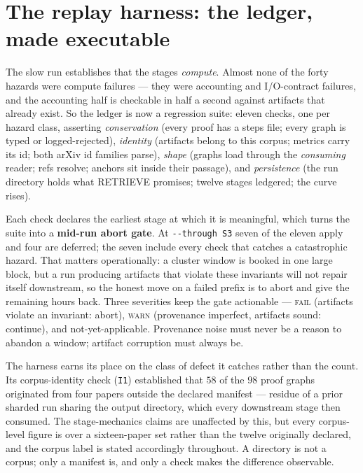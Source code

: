 \documentclass[11pt]{article}
\begin{document}
\section{The replay harness: the ledger, made executable}
\label{sec:replay}

The slow run establishes that the stages \emph{compute}. Almost none of the
forty hazards were compute failures --- they were accounting and I/O-contract
failures, and the accounting half is checkable in half a second against
artifacts that already exist.
So the ledger is now a regression suite: eleven checks, one per hazard class,
asserting \emph{conservation} (every proof has a steps file; every graph is
typed or logged-rejected), \emph{identity} (artifacts belong to this corpus;
metrics carry its id; both arXiv id families parse), \emph{shape} (graphs load
through the \emph{consuming} reader; refs resolve; anchors sit inside their
passage), and \emph{persistence} (the run directory holds what RETRIEVE
promises; twelve stages ledgered; the curve rises).

Each check declares the earliest stage at which it is meaningful, which turns
the suite into a \textbf{mid-run abort gate}. At \texttt{-{}-through S3} seven of
the eleven apply and four are deferred; the seven include every check that
catches a catastrophic hazard. That matters operationally: a cluster window is
booked in one large block, but a run producing artifacts that violate these
invariants will not repair itself downstream, so the honest move on a failed
prefix is to abort and give the remaining hours back. Three severities keep the
gate actionable --- \textsc{fail} (artifacts violate an invariant: abort),
\textsc{warn} (provenance imperfect, artifacts sound: continue), and
not-yet-applicable. Provenance noise must never be a reason to abandon a
window; artifact corruption must always be.

The harness earns its place on the class of defect it catches rather than the
count. Its corpus-identity check (\texttt{I1}) established that $58$ of the
$98$ proof graphs originated from four papers outside the declared manifest ---
residue of a prior sharded run sharing the output directory, which every
downstream stage then consumed. The stage-mechanics claims are unaffected by
this, but every corpus-level figure is over a sixteen-paper set rather than the
twelve originally declared, and the corpus label is stated accordingly
throughout. A directory is not a corpus; only a manifest is, and only a check
makes the difference observable.






\end{document}
